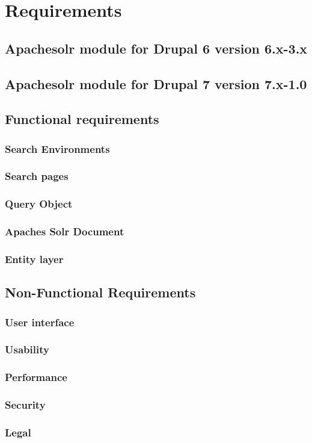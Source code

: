 \chapter{Requirements}
\section{Apachesolr module for Drupal 6 version 6.x-3.x}
\section{Apachesolr module for Drupal 7 version 7.x-1.0}
\section{Functional requirements}
\subsection{Search Environments}
\subsection{Search pages}
\subsection{Query Object}
\subsection{Apaches Solr Document}
\subsection{Entity layer}
\section{Non-Functional Requirements}
\subsection{User interface}
\subsection{Usability}
\subsection{Performance}
\subsection{Security}
\subsection{Legal}

